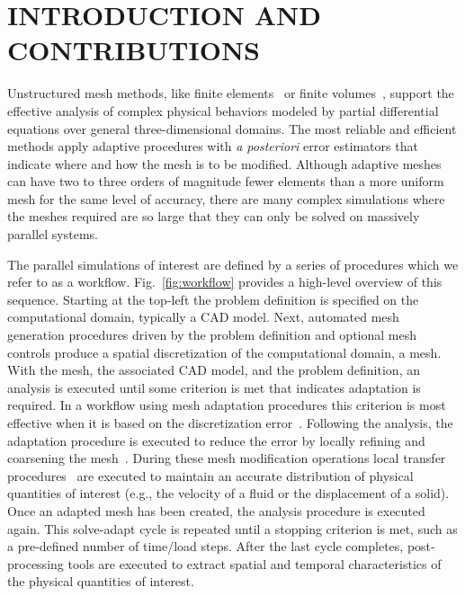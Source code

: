 \chapter{INTRODUCTION AND CONTRIBUTIONS}
\label{chp:intro}

Unstructured mesh methods, like finite elements~\cite{hughes2012finite} or
finite volumes~\cite{abgrallFiniteVolume2016}, support the
effective analysis of complex physical behaviors modeled by partial differential
equations over general three-dimensional domains.
The most reliable and efficient methods apply adaptive procedures with \textit{a
posteriori} error estimators that indicate where and how the mesh is to be
modified.
Although adaptive meshes can have two to three orders of magnitude fewer
elements than a more uniform mesh for the same level of accuracy, there are many
complex simulations where the meshes required are so large that they can only be
solved on massively parallel systems.

The parallel simulations of interest are defined by a series of procedures which
we refer to as a workflow.
Fig.~\ref{fig:workflow} provides a high-level overview of this sequence.
Starting at the top-left the problem definition is specified on the
computational domain, typically a CAD model.
Next, automated mesh generation procedures driven by the problem definition and
optional mesh controls produce a spatial discretization of the computational
domain, a mesh.
With the mesh, the associated CAD model, and the problem definition, an analysis
is executed until some criterion is met that indicates adaptation is required.
In a workflow using mesh adaptation procedures this criterion is most effective
when it is based on the discretization error~\cite{hughes2012finite}.
Following the analysis, the adaptation procedure is executed to reduce the error
by locally refining and coarsening the mesh~\cite{li20053d,alauzet2006parallel}.
During these mesh modification operations local transfer
procedures~\cite{ibanezthesis} are executed to maintain an accurate
distribution of physical quantities of interest (e.g., the velocity of a fluid
or the displacement of a solid).
Once an adapted mesh has been created, the analysis procedure is executed again.
This solve-adapt cycle is repeated until a stopping criterion is met, such as a
pre-defined number of time/load steps.
After the last cycle completes, post-processing tools are executed to extract
spatial and temporal characteristics of the physical quantities of interest.

